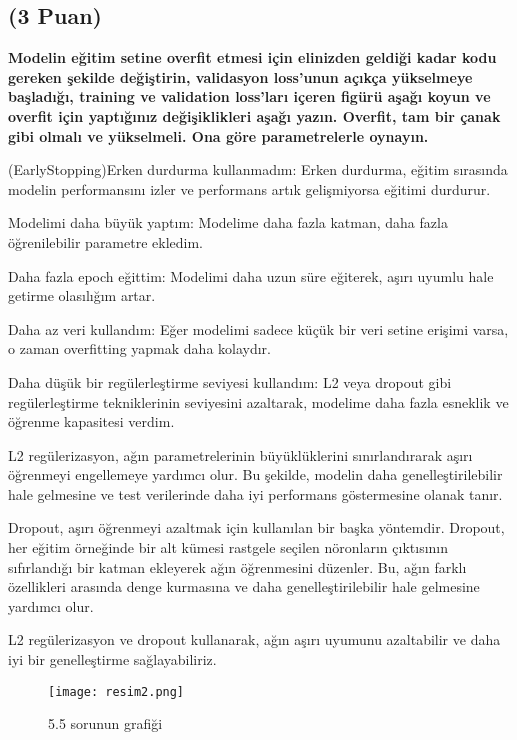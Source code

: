 \documentclass[11pt]{article}
\begin{document}
\subsection{(3 Puan)} \textbf{Modelin eğitim setine overfit etmesi için elinizden geldiği kadar kodu gereken şekilde değiştirin, validasyon loss'unun açıkça yükselmeye başladığı, training ve validation loss'ları içeren figürü aşağı koyun ve overfit için yaptığınız değişiklikleri aşağı yazın. Overfit, tam bir çanak gibi olmalı ve yükselmeli. Ona göre parametrelerle oynayın.}

(EarlyStopping)Erken durdurma kullanmadım: Erken durdurma, eğitim sırasında modelin performansını izler ve performans artık gelişmiyorsa eğitimi durdurur.

Modelimi daha büyük yaptım: Modelime daha fazla katman, daha fazla öğrenilebilir parametre ekledim.

Daha fazla epoch eğittim: Modelimi daha uzun süre eğiterek, aşırı uyumlu hale getirme olasılığım  artar.

Daha az veri kullandım: Eğer modelimi sadece küçük bir veri setine erişimi varsa, o zaman overfitting yapmak daha kolaydır.

Daha düşük bir regülerleştirme seviyesi kullandım: L2 veya dropout gibi regülerleştirme tekniklerinin seviyesini azaltarak, modelime daha fazla esneklik ve öğrenme kapasitesi verdim.

L2 regülerizasyon, ağın parametrelerinin büyüklüklerini sınırlandırarak aşırı öğrenmeyi engellemeye yardımcı olur. Bu şekilde, modelin daha genelleştirilebilir hale gelmesine ve test verilerinde daha iyi performans göstermesine olanak tanır.

Dropout, aşırı öğrenmeyi azaltmak için kullanılan bir başka yöntemdir. Dropout, her eğitim örneğinde bir alt kümesi rastgele seçilen nöronların çıktısının sıfırlandığı bir katman ekleyerek ağın öğrenmesini düzenler. Bu, ağın farklı özellikleri arasında denge kurmasına ve daha genelleştirilebilir hale gelmesine yardımcı olur.

L2 regülerizasyon ve dropout kullanarak, ağın aşırı uyumunu azaltabilir ve daha iyi bir genelleştirme sağlayabiliriz.

\begin{figure}[ht!]
    \centering
    \texttt{[image: resim2.png]}
    \caption{5.5 sorunun grafiği}
    \label{fig:my_pic}
\end{figure}

\newpage{}  
\end{document}
